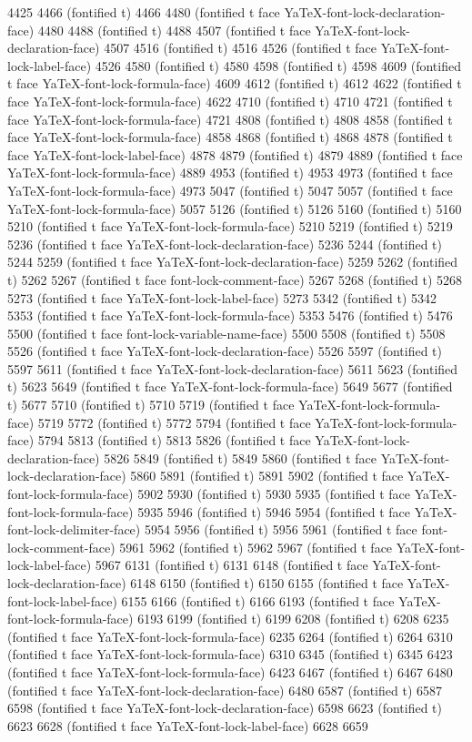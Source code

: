 4425 4466 (fontified t) 4466 4480 (fontified t face YaTeX-font-lock-declaration-face) 4480 4488 (fontified t) 4488 4507 (fontified t face YaTeX-font-lock-declaration-face) 4507 4516 (fontified t) 4516 4526 (fontified t face YaTeX-font-lock-label-face) 4526 4580 (fontified t) 4580 4598 (fontified t) 4598 4609 (fontified t face YaTeX-font-lock-formula-face) 4609 4612 (fontified t) 4612 4622 (fontified t face YaTeX-font-lock-formula-face) 4622 4710 (fontified t) 4710 4721 (fontified t face YaTeX-font-lock-formula-face) 4721 4808 (fontified t) 4808 4858 (fontified t face YaTeX-font-lock-formula-face) 4858 4868 (fontified t) 4868 4878 (fontified t face YaTeX-font-lock-label-face) 4878 4879 (fontified t) 4879 4889 (fontified t face YaTeX-font-lock-formula-face) 4889 4953 (fontified t) 4953 4973 (fontified t face YaTeX-font-lock-formula-face) 4973 5047 (fontified t) 5047 5057 (fontified t face YaTeX-font-lock-formula-face) 5057 5126 (fontified t) 5126 5160 (fontified t) 5160 5210 (fontified t face YaTeX-font-lock-formula-face) 5210 5219 (fontified t) 5219 5236 (fontified t face YaTeX-font-lock-declaration-face) 5236 5244 (fontified t) 5244 5259 (fontified t face YaTeX-font-lock-declaration-face) 5259 5262 (fontified t) 5262 5267 (fontified t face font-lock-comment-face) 5267 5268 (fontified t) 5268 5273 (fontified t face YaTeX-font-lock-label-face) 5273 5342 (fontified t) 5342 5353 (fontified t face YaTeX-font-lock-formula-face) 5353 5476 (fontified t) 5476 5500 (fontified t face font-lock-variable-name-face) 5500 5508 (fontified t) 5508 5526 (fontified t face YaTeX-font-lock-declaration-face) 5526 5597 (fontified t) 5597 5611 (fontified t face YaTeX-font-lock-declaration-face) 5611 5623 (fontified t) 5623 5649 (fontified t face YaTeX-font-lock-formula-face) 5649 5677 (fontified t) 5677 5710 (fontified t) 5710 5719 (fontified t face YaTeX-font-lock-formula-face) 5719 5772 (fontified t) 5772 5794 (fontified t face YaTeX-font-lock-formula-face) 5794 5813 (fontified t) 5813 5826 (fontified t face YaTeX-font-lock-declaration-face) 5826 5849 (fontified t) 5849 5860 (fontified t face YaTeX-font-lock-declaration-face) 5860 5891 (fontified t) 5891 5902 (fontified t face YaTeX-font-lock-formula-face) 5902 5930 (fontified t) 5930 5935 (fontified t face YaTeX-font-lock-formula-face) 5935 5946 (fontified t) 5946 5954 (fontified t face YaTeX-font-lock-delimiter-face) 5954 5956 (fontified t) 5956 5961 (fontified t face font-lock-comment-face) 5961 5962 (fontified t) 5962 5967 (fontified t face YaTeX-font-lock-label-face) 5967 6131 (fontified t) 6131 6148 (fontified t face YaTeX-font-lock-declaration-face) 6148 6150 (fontified t) 6150 6155 (fontified t face YaTeX-font-lock-label-face) 6155 6166 (fontified t) 6166 6193 (fontified t face YaTeX-font-lock-formula-face) 6193 6199 (fontified t) 6199 6208 (fontified t) 6208 6235 (fontified t face YaTeX-font-lock-formula-face) 6235 6264 (fontified t) 6264 6310 (fontified t face YaTeX-font-lock-formula-face) 6310 6345 (fontified t) 6345 6423 (fontified t face YaTeX-font-lock-formula-face) 6423 6467 (fontified t) 6467 6480 (fontified t face YaTeX-font-lock-declaration-face) 6480 6587 (fontified t) 6587 6598 (fontified t face YaTeX-font-lock-declaration-face) 6598 6623 (fontified t) 6623 6628 (fontified t face YaTeX-font-lock-label-face) 6628 6659 